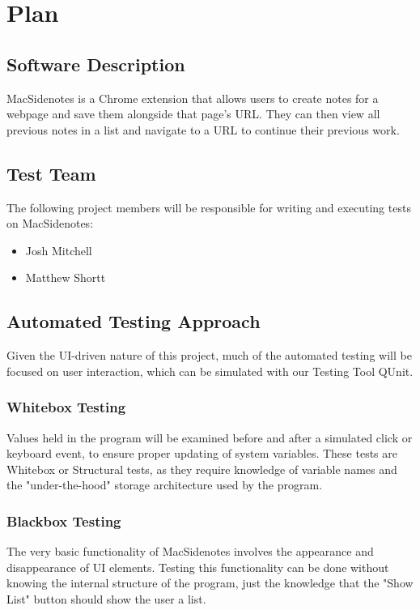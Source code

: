 \documentclass[12pt, titlepage]{article}
\begin{document}
\section{Plan}
	
\subsection{Software Description}

MacSidenotes is a Chrome extension that allows users to create notes for a 
webpage and save them alongside that page's URL. They can then view all 
previous notes in a list and navigate to a URL to continue their previous work.

\subsection{Test Team}

The following project members will be responsible for writing and executing 
tests on MacSidenotes:

\begin{itemize}
	\item Josh Mitchell
	\item Matthew Shortt
\end{itemize}

\subsection{Automated Testing Approach}

Given the UI-driven nature of this project, much of the automated testing 
will be focused on user interaction, which can be simulated with our Testing 
Tool QUnit.
\subsubsection{Whitebox Testing}
Values held in the program will be examined before and after a 
simulated click or keyboard event, to ensure proper updating of system 
variables. These tests are Whitebox or Structural tests, as they require 
knowledge of variable names and the "under-the-hood" storage architecture used 
by the program.
\subsubsection{Blackbox Testing}
The very basic functionality of MacSidenotes involves the appearance and 
disappearance of UI elements. Testing this functionality can be done without 
knowing the internal structure of the program, just the knowledge that the 
"Show List" button should show the user a list.
\end{document}
